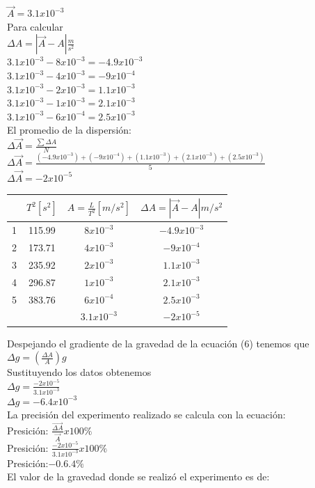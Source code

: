 \documentclass[10pt]{article}
\begin{document}
\begin{multicols}{2}
$\vec{A}=3.1x10^{-3}$\\
Para calcular \\
$\Delta A= |\vec{A} - A|  \frac{m}{s^2 }$\\
$3.1x10^{-3}   -8x10^{-3}=- 4.9x10^{-3}  $\\
$3.1x10^{-3}-4x10^{-3}=- 9x10^{-4}$\\
$3.1x10^{-3}-2x10^{-3}= 1.1x10^{-3}$\\
$3.1x10^{-3}-1x10^{-3}= 2.1x10^{-3}$\\
$3.1x10^{-3}-6x10^{-4}= 2.5x10^{-3}$\\
El promedio de la dispersión: \\
$\Delta \vec{A} = \frac{\sum \Delta A}{N}$\\
$\Delta \vec{A} = \frac{ (- 4.9x10^{-3}   )+(- 9x10^{-4} )+(1.1x10^{-3} )+(2.1x10^{-3} )+(2.5x10^{-3}   )}{5}$\\
$\Delta \vec{A} = - 2x10^{-5}$\\
\begin{center}
	\begin{adjustbox}{width=200pt}
		\begin{tabular}{|c|c|c|c|}
			\hline
			&	$T^2 [s^2]	$&$A=\frac{L}{T^2}  [m/s^2 ]	$&$\Delta A= |\vec{A} - A|  m/s^2 $\\
			\hline
			1	&115.99	&$8x10^{-3}$	&$- 4.9x10^{-3}$\\
			\hline
			2	&173.71	&$4x10^{-3}$&	$- 9x10^{-4}$  \\
			\hline
			3	&235.92	&$2x10^{-3}$	&$1.1x10^{-3}$    \\
			\hline
			4	&296.87&$	1x10^{-3}$&	$2.1x10^{-3}$\\
			\hline
			5	&383.76	&$6x10^{-4}$&$	2.5x10^{-3}$ \\
			\hline
			& &$3.1x10^{-3}$   &	$- 2x10^{-5}$   \\
			\hline 
		\end{tabular}
	\end{adjustbox}
\end{center}
Despejando el gradiente de la gravedad de la ecuación (6) tenemos que  \\

$\Delta g=(\frac{\Delta A}{A})g $\\
Sustituyendo los datos obtenemos\\
$\Delta g=  \frac{- 2x10^{-5}}{3.1x10^{-3} }$\\
$\Delta g= -6.4x10^{-3}$\\
La precisión del experimento realizado se calcula con la ecuación: \\
Presición:  $\frac{\vec{\Delta A}}{\vec{A}}x100\%$\\
Presición:  $\frac{- 2x10^{-5}}{3.1x10^{-3}} x100\%$\\
Presición:$ -0.6.4\%$\\
El valor de la gravedad donde se realizó el experimento es de: \\


\end{multicols}
\end{document}
